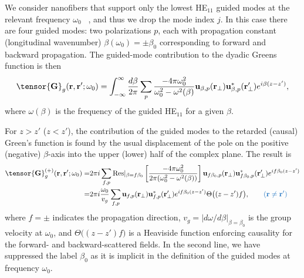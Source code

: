 \documentclass[preprint,aps,pra,onecolumn]{revtex4-1} %
\newcommand{\change}[1]{{\color{RoyalBlue} #1}}
\begin{document}
We consider nanofibers that support only the lowest HE$_{11}$ guided modes at the relevant frequency $\omega_0$ ~\cite{Yariv}, and thus we drop the mode index $j$.  In this case there are four guided modes: two polarizations $p$, each with propagation constant (longitudinal wavenumber) $\beta(\omega_0) = \pm\beta_0$ corresponding to forward and backward propagation.  
The guided-mode contribution to the dyadic Greens function is then 
	\begin{equation} \label{Eq::GreensEigenmodes}
		\tensor{\mathbf{G}}_g(\br,\br'; \omega_0) = \int_{-\infty}^\infty \frac{d \beta}{2 \pi} \sum_{p} 
\frac{-4\pi\omega_0^2}{\omega_0^2-\omega^2(\beta)} \mathbf{u}_{\beta,p} (\br_\perp)\mathbf{u}^*_{\beta,p} 
(\br_{\perp}^\prime) e^{i\beta(z-z')},
	\end{equation}
where $ \omega(\beta)$ is the frequency of the guided HE$_{11}$ for a given $\beta$.  

For $z>z'$ ($z<z'$), the contribution of the guided modes to the retarded (causal) Green's function is found by the 
usual displacement of the pole on the positive (negative) $\beta$-axis into the upper (lower) half of 
the complex plane. The result is \cite{manga_rao_single_2007}
	\begin{align} 
		\tensor{\mathbf{G}}^{(+)}_g(\br,\br'; \omega_0) = &2\pi i \sum_{f,p}  {\rm Res}\vert_{\beta =f\beta_0} 
\left[\frac{-4\pi \omega_0^2 }{2\pi ( \omega_0^2-\omega^2(\beta))}\right]  \mathbf{u}_{f\beta_0, p} 
(\br_\perp)\mathbf{u}^*_{f\beta_0, p} (\br_{\perp}^\prime)e^{if \beta_0 (z-z')} \nonumber \\
= & 2\pi i \frac{\omega_0}{v_g } \sum_{f,p} \mathbf{u}_{f, p} (\br_\perp)\mathbf{u}^*_{f , p} 
(\br_{\perp}^\prime) e^{i f \beta_0(z-z')} \Theta \big( (z-z')f \big), \quad \quad \change{(\mbf{r} \neq \mbf{r}')} \label{Eq::GreensGuided}
	\end{align}
where $f=\pm$ indicates the propagation direction, $v_g= \vert d\omega/d\beta \vert_{\beta=\beta_0}$ is the group velocity at $\omega_0$, and $\Theta \big( (z-z')f \big)$ is a Heaviside function enforcing causality for the forward- and backward-scattered fields. In the second line, we have suppressed the label $\beta_0$ as it is implicit in the definition of the guided modes at frequency $\omega_0$. 
\end{document}

